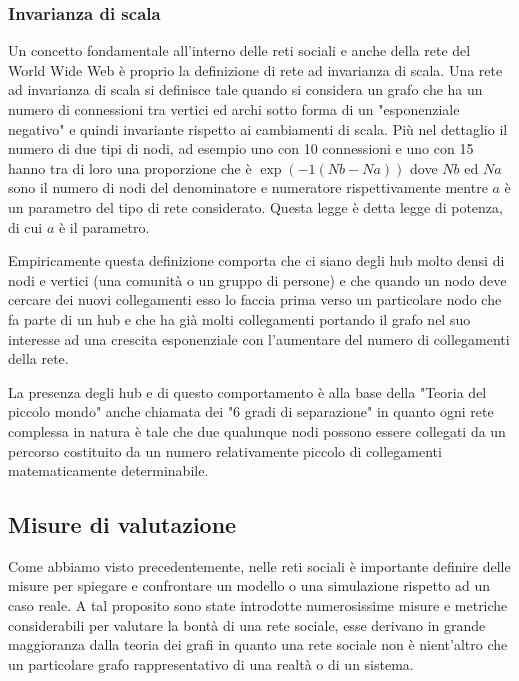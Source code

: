 \subsubsection{Invarianza di scala}
Un concetto fondamentale all'interno delle reti sociali e anche della rete del World Wide Web è proprio la definizione di rete ad invarianza di scala.
Una rete ad invarianza di scala si definisce tale quando si considera un grafo che ha un numero di connessioni tra vertici ed archi sotto forma di un "esponenziale negativo" e quindi invariante rispetto ai cambiamenti di scala.
Più nel dettaglio il numero di due tipi di nodi, ad esempio uno con 10 connessioni e uno con 15 hanno tra di loro una proporzione che è $\exp(-1 (Nb-Na)) $ dove $Nb$ ed $Na$ sono il numero di nodi del denominatore e numeratore rispettivamente mentre $a$ è un parametro del tipo di rete considerato. Questa legge è detta legge di potenza, di cui $a$ è il parametro. \cite{ReteInvarianzaScala}

Empiricamente questa definizione comporta che ci siano degli hub molto densi di nodi e vertici (una comunità o un gruppo di persone) e che quando un nodo deve cercare dei nuovi collegamenti esso lo faccia prima verso un particolare nodo che fa parte di un hub e che ha già molti collegamenti portando il grafo nel suo interesse ad una crescita esponenziale con l'aumentare del numero di collegamenti della rete.

La presenza degli hub e di questo comportamento è alla base della "Teoria del piccolo mondo" anche chiamata dei "6 gradi di separazione" in quanto ogni rete complessa in natura è tale che due qualunque nodi possono essere collegati da un percorso costituito da un numero relativamente piccolo di collegamenti matematicamente determinabile. \cite{TeoriaPiccoloMondo}

\subsection{Misure di valutazione}

Come abbiamo visto precedentemente, nelle reti sociali è importante definire delle misure per spiegare e confrontare un modello o una simulazione rispetto ad un caso reale.
A tal proposito sono state introdotte numerosissime misure e metriche considerabili per valutare la bontà di una rete sociale, esse derivano in grande maggioranza dalla teoria dei grafi in quanto una rete sociale non è nient'altro che un particolare grafo rappresentativo di una realtà o di un sistema.


